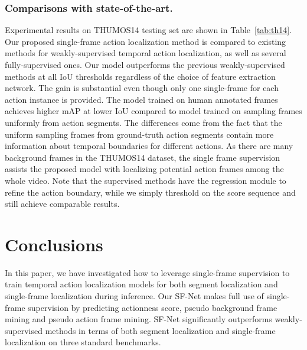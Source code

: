 \documentclass[runningheads]{llncs}
\begin{document}
	


	
	\subsubsection{Comparisons with state-of-the-art.}
	
	Experimental results on THUMOS14 testing set are shown in Table~\ref{tab:th14}. 
	Our proposed single-frame action localization method is compared to existing methods for weakly-supervised temporal action localization, as well as several fully-supervised ones. 
	Our model outperforms the previous weakly-supervised methods at all IoU thresholds regardless of the choice of feature extraction network. The gain is substantial even though only one single-frame for each action instance is provided.
The model trained on human annotated frames achieves higher mAP at lower IoU compared to model trained on sampling frames uniformly from action segments. The differences come from the fact that the uniform sampling frames from ground-truth action segments contain more information about temporal boundaries for different actions.
	As there are many background frames in the THUMOS14 dataset, the single frame supervision assists the proposed model with localizing potential action frames among the whole video.
	Note that the supervised methods have the regression module to refine the action boundary, while we simply threshold on the score sequence and still achieve comparable results. 
	
	
	


	


	


	


	
	
	
\section{Conclusions}
	In this paper, we have investigated how to leverage single-frame supervision to train temporal action localization models for both segment localization and single-frame localization during inference.
	Our SF-Net makes full use of single-frame supervision by predicting actionness score, pseudo background frame mining and pseudo action frame mining. 
	SF-Net significantly outperforms weakly-supervised methods in terms of both segment localization and single-frame localization on three standard benchmarks. 
	
\end{document}
